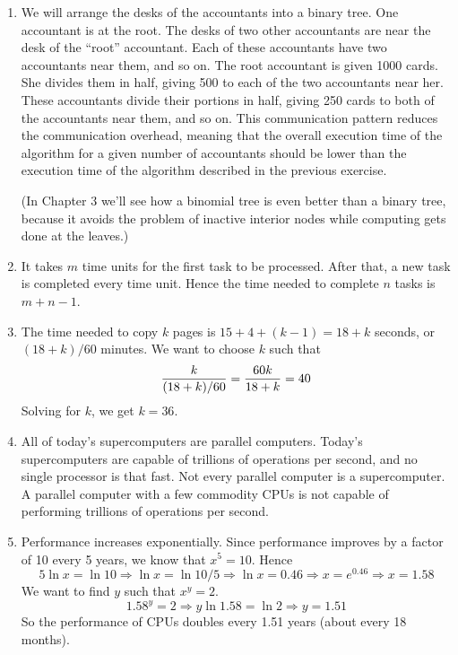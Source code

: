 \begin{enumerate}
\item We will arrange the desks of the accountants into a binary tree.
      One accountant is at the root. The desks of two other accountants are
      near the desk of the ``root'' accountant. Each of these accountants
      have two accountants near them, and so on.
      The root accountant is given 1000 cards. She divides them in half,
      giving 500 to each of the two accountants near her. These accountants
      divide their portions in half, giving 250 cards to both of the
      accountants near them, and so on.
      This communication pattern reduces the communication overhead, meaning
      that the overall execution time of the algorithm for a given number of
      accountants should be lower than the execution time of the algorithm
      described in the previous exercise.

      (In Chapter 3 we'll see how a binomial tree is even better than a
      binary tree, because it avoids the problem of inactive interior
      nodes while computing gets done at the leaves.)

\item It takes $m$ time units for the first task to be processed.
      After that, a new task is completed every time unit.
      Hence the time needed to complete $n$ tasks is $m + n - 1$.

\item The time needed to copy $k$ pages is $15 + 4 + (k-1) = 18 + k$ seconds,
      or $(18 + k)/60$ minutes.
      We want to choose $k$ such that
      $${{k}\over{(18+k)/60}} = {{60k}\over{18+k}} = 40$$
      Solving for $k$, we get $k = 36$.
  
\item All of today's supercomputers are parallel computers.
      Today's supercomputers are capable of trillions of operations
      per second, and no single processor is that fast.
      Not every parallel computer is a supercomputer.
      A parallel computer with a few commodity CPUs is not capable of
      performing trillions of operations per second.

\item Performance increases exponentially.
      Since performance improves by a factor of 10 every 5 years, we know
      that $x^5 = 10$. Hence
      $$5\ln x = \ln 10 \Rightarrow \ln x = \ln 10/5 \Rightarrow
        \ln x = 0.46 \Rightarrow x = e^{0.46} \Rightarrow x = 1.58$$
      We want to find $y$ such that $x^y = 2$.
      $$1.58^y = 2 \Rightarrow y \ln 1.58 = \ln 2 \Rightarrow y = 1.51$$
      So the performance of CPUs doubles every 1.51 years
      (about every 18 months).


\end{enumerate}
